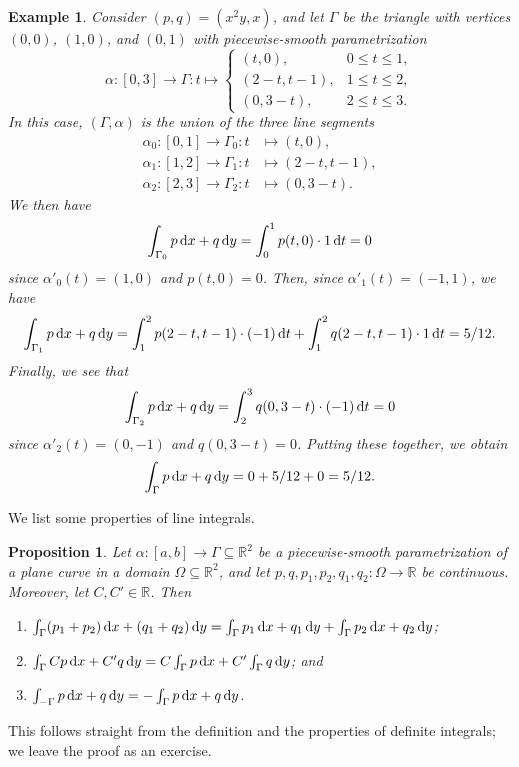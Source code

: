 \documentclass[10pt]{article}
\makeatletter
\newcommand{\R}{\mathbb{R}}
\theoremstyle{newstyle}
\newtheorem{prop}[thm]{Proposition}
\newtheorem{exmp}[thm]{Example}
\newenvironment{pf}[1][\proofname]{\par
  \pushQED{\qed}%
  \normalfont \topsep0\p@\relax
  \trivlist
  \item[\hskip\labelsep\scshape
  #1\@addpunct{.}]\ignorespaces
}{%
  \popQED\endtrivlist\@endpefalse
}
\makeatother
\begin{document}
\begin{exmp}
Consider $(p, q) = (x^2y, x)$, and let $\Gamma$ be the triangle with vertices 
$(0, 0)$, $(1, 0)$, and $(0, 1)$ with piecewise-smooth parametrization 
\[ \alpha : [0, 3] \to \Gamma : t \mapsto \begin{cases} (t, 0), & 0 \leq t \leq 1, \\
(2-t, t-1), & 1\leq t \leq 2, \\ (0, 3-t), & 2 \leq t \leq 3. \end{cases} \]
In this case, $(\Gamma, \alpha)$ is the union of the three line segments 
\begin{align*}
    \alpha_0 : [0, 1] \to \Gamma_0 : t &\mapsto (t, 0), \\
    \alpha_1 : [1, 2] \to \Gamma_1 : t &\mapsto (2-t, t-1), \\
    \alpha_2 : [2, 3] \to \Gamma_2 : t &\mapsto (0, 3-t).
\end{align*}
We then have 
\[ \int_{\Gamma_0} p\,{\rm d}x + q\,{\rm d}y = \int_0^1 p(t, 0) \cdot 1 \, {\rm d}t = 0 \] 
since $\alpha'_0(t) = (1, 0)$ and $p(t, 0) = 0$. Then, since 
$\alpha'_1(t) = (-1, 1)$, we have 
\[ \int_{\Gamma_1} p\,{\rm d}x + q\,{\rm d}y = \int_1^2 p(2-t, t-1) \cdot (-1)\,{\rm d}t 
+ \int_1^2 q(2-t, t-1) \cdot 1 \, {\rm d}t = 5/12. \]
Finally, we see that 
\[ \int_{\Gamma_2} p\,{\rm d}x + q\,{\rm d}y = \int_2^3 q(0, 3-t) \cdot (-1) \,{\rm d}t = 0 \] 
since $\alpha'_2(t) = (0, -1)$ and $q(0, 3-t) = 0$. Putting these together, we obtain 
\[ \int_\Gamma p\,{\rm d}x + q\,{\rm d}y = 0 + 5/12 + 0 = 5/12. \]
\end{exmp}

We list some properties of line integrals. 

\begin{prop}
Let $\alpha : [a, b] \to \Gamma \subseteq \R^2$ be a piecewise-smooth parametrization of a 
plane curve in a domain $\Omega \subseteq \R^2$, and let $p, q, p_1, p_2, q_1, q_2 : 
\Omega \to \R$ be continuous. Moreover, let $C, C' \in \R$. Then
\begin{enumerate}[(1)]
    \item $\int_\Gamma (p_1+p_2)\,{\rm d}x + (q_1+q_2)\,{\rm d}y = 
    \int_\Gamma p_1\,{\rm d}x + q_1\,{\rm d}y + \int_\Gamma p_2\,{\rm d}x + q_2\,{\rm d}y$;
    \item $\int_\Gamma Cp\,{\rm d}x + C'q\,{\rm d}y = C\int_\Gamma p\,{\rm d}x + C'
    \int_\Gamma q\,{\rm d}y$; and 
    \item $\int_{-\Gamma} p\,{\rm d}x + q\,{\rm d}y = -\int_\Gamma p\,{\rm d}x + q\,{\rm d}y$.
\end{enumerate}
\end{prop}
\begin{pf}
This follows straight from the definition and the properties of definite integrals;
we leave the proof as an exercise.
\end{pf}
\end{document}
